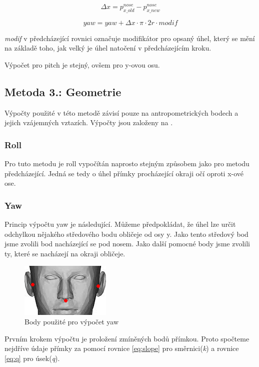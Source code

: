 \documentclass[12pt,a4paper,titlepage,final]{report}
\begin{document}
\begin{equation}\label{eq:x_delta}
\Delta x = p^{nose}_{x\_old} - p^{nose}_{x\_new}
\end{equation}

\begin{equation}\label{eq:tr_yaw}
yaw = yaw + \Delta x \cdot \pi \cdot 2 r \cdot modif
\end{equation}

\textit{modif} v předcházející rovnici označuje modifikátor pro opsaný úhel, který se mění na základě toho, jak velký je úhel natočení v předcházejícím kroku.

Výpočet pro pitch je stejný, ovšem pro y-ovou osu.


\subsection{Metoda 3.: Geometrie}
Výpočty použité v této metodě závisí pouze na antropometrických bodech a jejich vzájemných vztazích. Výpočty jsou založeny na \cite{murphy-chutorian_trivedi_2009}.
\subsubsection{Roll}
Pro tuto metodu je roll vypočítán naprosto stejným způsobem jako pro metodu předcházející. Jedná se tedy o úhel přímky procházející okraji očí oproti x-ové ose.

\subsubsection{Yaw}
Princip výpočtu yaw je následující. Můžeme předpokládat, že úhel lze určit odchylkou nějakého středového bodu obličeje od osy y. Jako tento středový bod jsme zvolili bod nacházející se pod nosem. Jako další pomocné body jsme zvolili ty, které se nacházejí na okraji obličeje. 

\begin{figure}[H]
    \centering
    \includegraphics[scale=1.5]{images/yaw_points.jpg}
    \caption{Body použité pro výpočet yaw}
    \label{fig:roll}
\end{figure}

Prvním krokem výpočtu je proložení zmíněných bodů přímkou. Proto spočteme nejdříve údaje přímky za pomocí rovnice \ref{eq:slope} pro směrnici(\textit{k}) a rovnice \ref{eq:q} pro úsek(\textit{q}).
\end{document}
